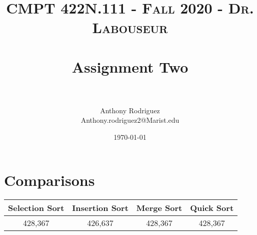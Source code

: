 \documentclass[letterpaper, 10pt,DIV=13]{scrartcl}
\title{	
   \normalfont \normalsize 
   \textsc{CMPT 422N.111 - Fall 2020 - Dr. Labouseur} \\[10pt] %
   \horrule{0.5pt} \\[0.25cm] 	%
   \huge Assignment Two  \\     	    %
   \horrule{0.5pt} \\[0.25cm] 	%
}
\author{Anthony Rodriguez \\ \normalsize Anthony.rodriguez2@Marist.edu}
\date{\normalsize\today} 	%
\numberwithin{equation}{section} %
\numberwithin{figure}{section} %
\numberwithin{table}{section} %
\begin{document}
\maketitle %

\section{Comparisons}
\bigskip
\begin{center}
 \begin{tabular}{||c c c c||} 
 \hline
 Selection Sort & Insertion Sort & Merge Sort & Quick Sort \\ [0.5ex] 
 \hline\hline
 428,367 & 426,637 & 428,367 & 428,367 \\ 
 \hline

\end{tabular}
\end{center}
\end{document}
